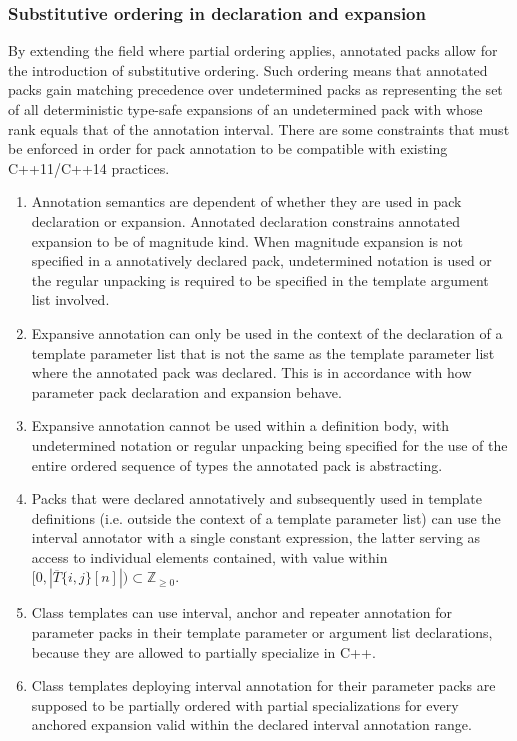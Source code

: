 \documentclass[ notitlepage
              , a4paper
              , twoside ]{article}
\newcommand{\parnum}{\bfseries\arabic{parcount}}
\newcounter{parcount}
\newcommand\p{%
    \stepcounter{parcount}%
    \leavevmode\marginpar[\hfill\parnum]{\parnum}%
}
\begin{document}
\subsubsection{Substitutive ordering in declaration and expansion}
\p By extending the field where partial ordering applies, annotated packs allow for the introduction of substitutive ordering.
Such ordering means that annotated packs gain matching precedence over undetermined packs as representing the set of all deterministic type-safe expansions of an undetermined pack with whose rank equals that of the annotation interval.
There are some constraints that must be enforced in order for pack annotation to be compatible with existing C++11/C++14 practices.

\begin{enumerate}
\item Annotation semantics are dependent of whether they are used in pack declaration or expansion.
Annotated declaration constrains annotated expansion to be of magnitude kind.
When magnitude expansion is not specified in a annotatively declared pack, undetermined notation is used or the regular unpacking is required to be specified in the template argument list involved.
\item Expansive annotation can only be used in the context of the declaration of a template parameter list that is not the same as the template parameter list where the annotated pack was declared. This is in accordance with how parameter pack declaration and expansion behave.
\item Expansive annotation cannot be used within a definition body, with undetermined notation or regular unpacking being specified for the use of the entire ordered sequence of types the annotated pack is abstracting.
\item Packs that were declared annotatively and subsequently used in template definitions (i.e. outside the context of a template parameter list) can use the interval annotator with a single constant expression, the latter serving as access to individual elements contained, with value within $[0,|\overline{T}\{i,j\}[n]|)\subset{\mathbb{Z}_{\geq 0}}$.
\item Class templates can use interval, anchor and repeater annotation for parameter packs in their template parameter or argument list declarations, because they are allowed to partially specialize in C++.
\item Class templates deploying interval annotation for their parameter packs are supposed to be partially ordered with partial specializations for every anchored expansion valid within the declared interval annotation range.

\end{enumerate}
\end{document}
